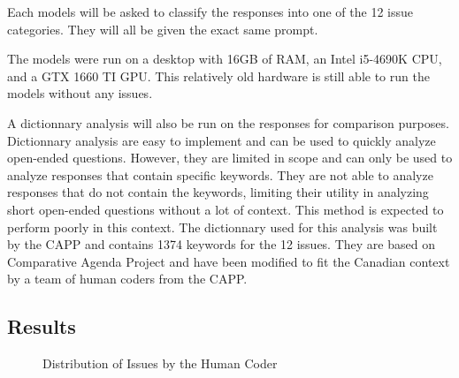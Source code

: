 \documentclass[
  authoryear,
  preprint,
  3p]{elsarticle}
\newenvironment{Shaded}{\begin{snugshade}}{\end{snugshade}}
\newcommand{\FunctionTok}[1]{\textcolor[rgb]{0.28,0.35,0.67}{#1}}
\newcommand{\NormalTok}[1]{\textcolor[rgb]{0.00,0.23,0.31}{#1}}
\newcommand{\OtherTok}[1]{\textcolor[rgb]{0.00,0.23,0.31}{#1}}
\newcommand{\SpecialCharTok}[1]{\textcolor[rgb]{0.37,0.37,0.37}{#1}}
\newcommand{\StringTok}[1]{\textcolor[rgb]{0.13,0.47,0.30}{#1}}
\begin{document}
Each models will be asked to classify the responses into one of the 12
issue categories. They will all be given the exact same prompt.

\begin{Shaded}
\end{Shaded}

The models were run on a desktop with 16GB of RAM, an Intel i5-4690K
CPU, and a GTX 1660 TI GPU. This relatively old hardware is still able
to run the models without any issues.

A dictionnary analysis will also be run on the responses for comparison
purposes. Dictionnary analysis are easy to implement and can be used to
quickly analyze open-ended questions. However, they are limited in scope
and can only be used to analyze responses that contain specific
keywords. They are not able to analyze responses that do not contain the
keywords, limiting their utility in analyzing short open-ended questions
without a lot of context. This method is expected to perform poorly in
this context. The dictionnary used for this analysis was built by the
CAPP and contains 1374 keywords for the 12 issues. They are based on
\citet{sevenans_etal14} Comparative Agenda Project and have been
modified to fit the Canadian context by a team of human coders from the
CAPP.

\subsection{Results}\label{results}

\begin{figure}[H]


\caption{\label{fig-distribution}Distribution of Issues by the Human
Coder}

\end{figure}%
\end{document}
